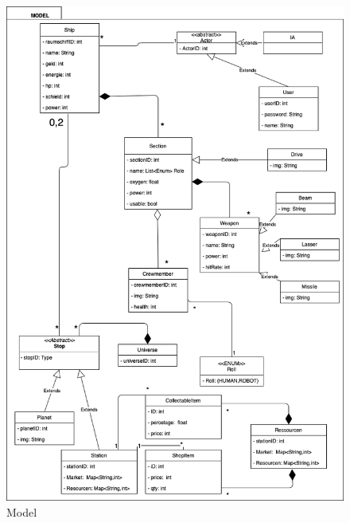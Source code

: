 \documentclass[fontsize=12pt,paper=a4,twoside]{scrartcl}
\begin{document}
\begin{figure}[htp]
	\centering
	\includegraphics[width=0.75\linewidth]{pics/Model.png}
	\caption{Model}
	\label{fig2}

\end{figure}

\newpage
\end{document}
